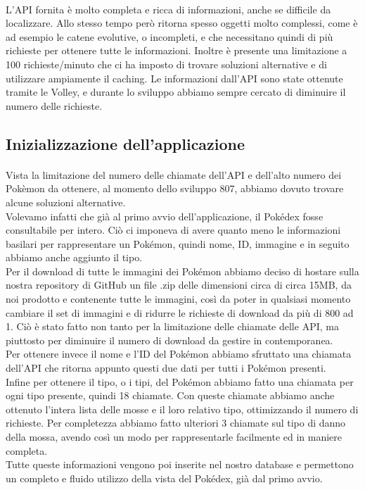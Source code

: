 \documentclass[a4paper,11pt]{article}
\begin{document}
  					\paragraph{}
  						L’API fornita è molto completa e ricca di informazioni, anche se difficile da localizzare. Allo stesso tempo però ritorna spesso oggetti molto complessi, come è ad esempio le catene evolutive, o incompleti, e che necessitano quindi di più richieste per ottenere tutte le informazioni. Inoltre è presente una limitazione a 100 richieste/minuto che ci ha imposto di trovare soluzioni alternative e di utilizzare ampiamente il caching. Le informazioni dall’API sono state ottenute tramite le Volley, e durante lo sviluppo abbiamo sempre cercato di diminuire il numero delle richieste.
  				\subsection{Inizializzazione dell'applicazione}
  					\paragraph{}
  						Vista la limitazione del numero delle chiamate dell’API e dell’alto numero dei Pokèmon da ottenere, al momento dello sviluppo 807, abbiamo dovuto trovare alcune soluzioni alternative.\\
  						Volevamo infatti che già al primo avvio dell’applicazione, il Pokédex fosse consultabile per intero. Ciò ci imponeva di avere quanto meno le informazioni basilari per rappresentare un Pokémon, quindi nome, ID, immagine e in seguito abbiamo anche aggiunto il tipo.\\
  						Per il download di tutte le immagini dei Pokémon abbiamo deciso di hostare sulla nostra repository di GitHub un file .zip delle dimensioni circa di circa 15MB, da noi prodotto e contenente tutte le immagini, così da poter in qualsiasi momento cambiare il set di immagini e di ridurre le richieste di download da più di 800 ad 1. Ciò è stato fatto non tanto per la limitazione delle chiamate delle API, ma piuttosto per diminuire il numero di download da gestire in contemporanea.\\
  						Per ottenere invece il nome e l’ID del Pokémon abbiamo sfruttato una chiamata dell’API che ritorna appunto questi due dati per tutti i Pokémon presenti.\\
  						Infine per ottenere il tipo, o i tipi, del Pokémon abbiamo fatto una chiamata per ogni tipo presente, quindi 18 chiamate. Con queste chiamate abbiamo anche ottenuto l’intera lista delle mosse e il loro relativo tipo, ottimizzando il numero di richieste. Per completezza abbiamo fatto ulteriori 3 chiamate sul tipo di danno della mossa, avendo così un modo per rappresentarle facilmente ed in maniere completa.\\
  						Tutte queste informazioni vengono poi inserite nel nostro database e permettono un completo e fluido utilizzo della vista del Pokédex, già dal primo avvio.\\
\end{document}
